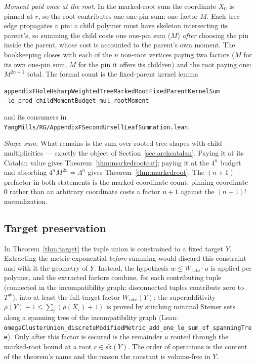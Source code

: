 \documentclass[11pt]{article}
\newcommand{\lean}[1]{\texttt{#1}}
\newcommand{\skel}{\mathrm{sk}}
\begin{document}
\emph{Moment paid once at the root.}  In the marked-root sum the
coordinate $X_0$ is pinned at $r$, so the root contributes one
one-pin sum: one factor $M$.  Each tree edge propagates a pin: a
child polymer must have skeleton intersecting its parent's, so
summing the child costs one one-pin sum ($M$) \emph{after} choosing
the pin inside the parent, whose cost is accounted to the parent's
own moment.  The bookkeeping closes with each of the $n$ non-root
vertices paying two factors ($M$ for its own one-pin sum, $M$ for the
pin it offers its children) and the root paying one: $M^{2n+1}$
total.  The formal count is the fixed-parent kernel lemma
\begin{center}\small
\lean{appendixFHoleHsharpWeightedTreeMarkedRootFixedParentKernelSum}\\
\lean{\_le\_prod\_childMomentBudget\_mul\_rootMoment}
\end{center}
and its consumers in
\lean{YangMills/RG/AppendixFSecondUrsellLeafSummation.lean}.

\emph{Shape sum.}  What remains is the sum over rooted tree shapes
with child multiplicities --- exactly the object of
Section~\ref{sec:archcatalan}.  Paying it at its Catalan value gives
Theorem~\ref{thm:markedrootcat}; paying it at the $4^n$ budget and
absorbing $4^n M^{2n} = \Lambda^n$ gives Theorem~\ref{thm:markedroot}.
The $(n+1)$ prefactor in both statements is the marked-coordinate
count: pinning coordinate $0$ rather than an arbitrary coordinate
costs a factor $n+1$ against the $(n+1)!$ normalization.

\subsection{Target preservation}\label{sec:archtarget}

In Theorem~\ref{thm:target} the tuple union is constrained to a fixed
target $Y$.  Extracting the metric exponential \emph{before} summing
would discard this constraint and with it the geometry of $Y$.
Instead, the hypothesis $w \le W_{\mathrm{rate}} \cdot u$ is applied
per polymer, and the extracted factors combine, for each contributing
tuple (connected in the incompatibility graph; disconnected tuples
contribute zero to $T^{\#}$), into at least the full-target factor
$W_{\mathrm{rate}}(Y)$: the superadditivity
$\rho(Y) + 1 \le \sum_i (\rho(X_i) + 1)$ is proved by stitching
minimal Steiner sets along a spanning tree of the incompatibility
graph (Lean:
\lean{omegaClusterUnion\_discreteModifiedMetric\_add\_one\_le}\allowbreak\lean{\_sum\_of\_spanningTree}).
Only after this factor is secured is the remainder $u$ routed through
the marked-root bound at a root $r \in \skel(Y)$.  The order of
operations is the content of the theorem's name and the reason the
constant is volume-free in $Y$.
\end{document}
